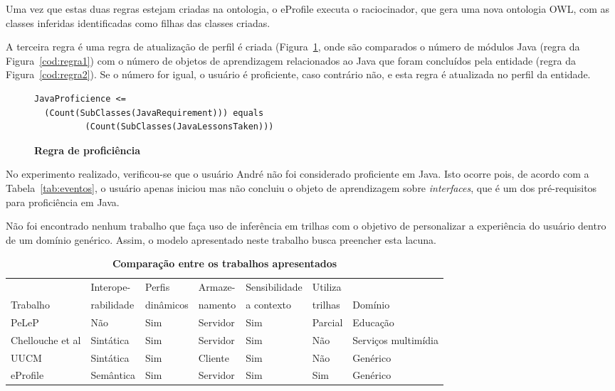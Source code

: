 \documentclass[times, 10pt, twocolumn]{article}
\begin{document}
Uma vez que estas duas regras estejam criadas na ontologia, o eProfile executa o raciocinador, que gera uma nova ontologia OWL, com as classes inferidas identificadas como filhas das classes criadas.

A terceira regra é uma regra de atualização de perfil é criada (Figura~\ref{cod:regra3}, onde são comparados o número de módulos Java (regra da Figura~\ref{cod:regra1}) com o número de objetos de aprendizagem relacionados ao Java que foram concluídos pela entidade (regra da Figura~\ref{cod:regra2}). Se o número for igual, o usuário é proficiente, caso contrário não, e esta regra é atualizada no perfil da entidade.

\begin{figure}
\begin{lstlisting}
JavaProficience <= 
  (Count(SubClasses(JavaRequirement))) equals
          (Count(SubClasses(JavaLessonsTaken)))
\end{lstlisting}
\caption{\textbf{Regra de proficiência}}
\label{cod:regra3}
\end{figure}

No experimento realizado, verificou-se que o usuário André não foi considerado proficiente em Java. Isto ocorre pois, de acordo com a Tabela~\ref{tab:eventos}, o usuário apenas iniciou mas não concluiu o objeto de aprendizagem sobre {\em interfaces}, que é um dos pré-requisitos para proficiência em Java.

\label{ch:relacionados}

Não foi encontrado nenhum trabalho que faça uso de inferência em trilhas com o objetivo de personalizar a experiência do usuário dentro de um domínio genérico. Assim, o modelo apresentado neste trabalho busca preencher esta lacuna. 

\begin{table}\centering\footnotesize
  \begin{tabular*}{0.7\textwidth}{@{}lllllll@{}}
    \toprule
                                         & Interope-  & Perfis    & Armaze-  & Sensibilidade & Utiliza & \\
    Trabalho                             & rabilidade & dinâmicos & namento  & a contexto    & trilhas & Domínio \\
    \midrule
    PeLeP                                & Não        & Sim       & Servidor & Sim           & Parcial & Educação \\
    Chellouche et al                     & Sintática  & Sim       & Servidor & Sim           & Não     & Serviços multimídia \\
    UUCM                                 & Sintática  & Sim       & Cliente  & Sim           & Não     & Genérico \\
    eProfile                             & Semântica  & Sim       & Servidor & Sim           & Sim     & Genérico \\
    \bottomrule
  \end{tabular*}
  \caption{\textbf{Comparação entre os trabalhos apresentados}}
  \label{tab:comparacao2}
\end{table}
\end{document}
